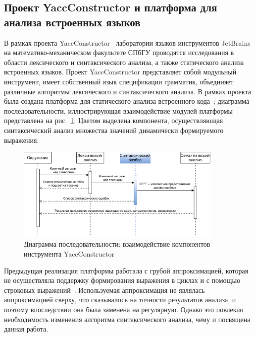 \subsection{Проект YaccConstructor и платформа для анализа встроенных языков}
В рамках проекта YaccConstructor~\cite{YC} лаборатории языков инструментов JetBrains на математико-механическом факультете СПбГУ проводятся исследования в области лексического и синтаксического анализа, а также статического анализа встроенных языков. Проект YaccConstructor представляет собой модульный инструмент, имеет собственный язык спецификации грамматик, объединяет различные алгоритмы лексического и синтаксического анализа. В рамках проекта была создана платформа для статического анализа встроенного кода~\cite{SECR14}; диаграмма последовательности, иллюстрирующая взаимодействие модулей платформы представлена на рис.~\ref{seq}. Цветом выделена компонента, осуществляющая синтаксический анализ множества значений динамически формируемого выражения. 
\begin{figure}[!h]
 \centering
 \includegraphics[width=10cm]{Verbitskaya/pics/Seq_rus.png}
 \caption{Диаграмма последовательности: взаимодействие компонентов
инструмента YaccConstructor}
 \label{seq}
\end{figure}

Предыдущая реализация платформы работала с грубой аппроксимацией, которая не осуществляла поддержку формирования выражения в циклах и с помощью строковых выражений~\cite{SECR13}. Используемая аппроксимация не являлась аппроксимацией сверху, что сказывалось на точности результатов анализа, и поэтому впоследствии она была заменена на регулярную. Однако это повлекло необходимость изменения алгоритма синтаксического анализа, чему и посвящена данная работа. 
